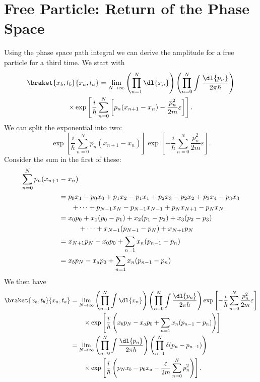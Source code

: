 \documentclass[fleqn]{NotesClass}
\begin{document}
    \section{Free Particle: Return of the Phase Space}
    Using the phase space path integral we can derive the amplitude for a free particle for a third time.
    We start with
    \begin{multline}
        \braket{x_b, t_b}{x_a, t_a} = \lim_{N\to\infty} \left( \prod_{n=1}^{N} \dl{x_n} \right) \left( \prod_{n=0}^{N} \int\frac{\dl{p_n}}{2\pi\hbar} \right)\\
        \times \exp\left[ \frac{i}{\hbar} \sum_{n=0}^{N} \left[ p_n(x_{n+1} - x_n) - \frac{p_n^2}{2m}\varepsilon \right] \right].
    \end{multline}
    We can split the exponential into two:
    \begin{equation}
        \exp\left[ \frac{i}{\hbar} \sum_{n=0}^{N} p_n(x_{n+1} - x_n) \right]\exp \left[ - \frac{i}{\hbar} \sum_{n=0}^{N} \frac{p_n^2}{2m}\varepsilon \right].
    \end{equation}
    Consider the sum in the first of these:
    \begin{align}
        \sum_{n=0}^{N} p_n(x_{n+1} - x_n) &\\
        &\mkern-50mu=p_0x_1 - p_0x_0 + p_1x_2 - p_1x_1 + p_2x_3 - p_2x_2 + p_3x_4 - p_3x_3\\
        +&\dotsb + p_{N-1}x_N - p_{N-1}x_{N-1} + p_Nx_{N+1} - p_Nx_N\\
        &\mkern-50mu= x_0p_0 + x_1(p_0 - p_1) + x_2(p_1 - p_2) + x_3(p_2 - p_3)\\
        &+ \dotsb + x_{N-1}(p_{N-1} - p_N) + x_{N+1}p_N\\
        &\mkern-50mu= x_{N+1}p_N - x_0p_0 + \sum_{n=1} x_n(p_{n-1} - p_n)\\
        &\mkern-50mu= x_bp_N - x_ap_0 + \sum_{n=1} x_n(p_{n-1} - p_n)\\
    \end{align}
    We then have
    \begin{align}
        \braket{x_b, t_b}{x_a, t_a} &= \lim_{N\to\infty} \left( \prod_{n=1}^{N} \int\dl{x_n} \right) \left( \prod_{n=0}^{N} \int\frac{\dl{p_n}}{2\pi\hbar} \right) \exp \left[ - \frac{i}{\hbar} \sum_{n=0}^{N} \frac{p_n^2}{2m}\varepsilon \right]\notag\\
        & \qquad \times \exp\left[ \frac{i}{\hbar} \left( x_bp_N - x_ap_0 + \sum_{n=1} x_n(p_{n-1} - p_n) \right) \right]\\
        &= \lim_{N\to\infty} \left( \prod_{n=0}^{N} \int \frac{\dl{p_n}}{2\pi\hbar} \right) \left( \prod_{n=1}^{N} \delta(p_n - p_{n-1}) \right)\notag\\
        &\qquad \times \exp\left[ \frac{i}{\hbar} \left( p_Nx_b - p_0x_a - \frac{\varepsilon}{2m} \sum_{n=0}^{N} p_n^2 \right) \right].
    \end{align}
\end{document}

